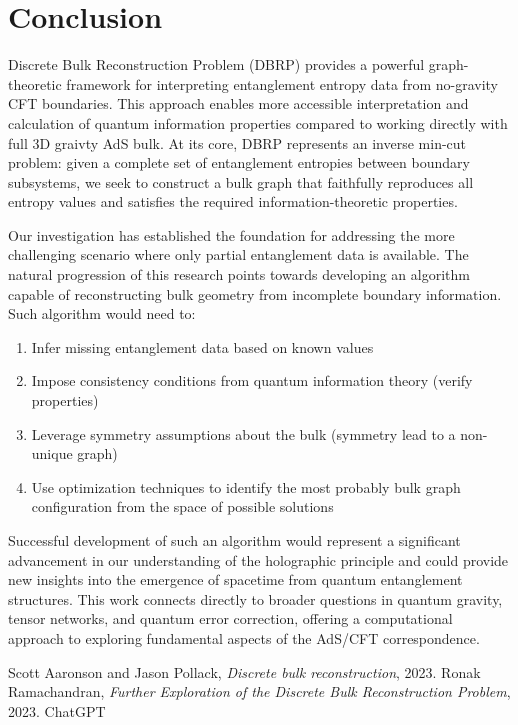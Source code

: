 \documentclass[12pt]{article}
\begin{document}
\section{Conclusion}

\hspace{0.5cm} Discrete Bulk Reconstruction Problem (DBRP) provides a powerful graph-theoretic framework for interpreting entanglement entropy data from no-gravity CFT boundaries. This approach enables more accessible interpretation and calculation of quantum information properties compared to working directly with full 3D graivty AdS bulk. At its core, DBRP represents an inverse min-cut problem: given a complete set of entanglement entropies between boundary subsystems, we seek to construct a bulk graph that faithfully reproduces all entropy values and satisfies the required information-theoretic properties. 

Our investigation has established the foundation for addressing the more challenging scenario where only partial entanglement data is available. The natural progression of this research points towards developing an algorithm capable of reconstructing bulk geometry from incomplete boundary information.
Such algorithm would need to:
\begin{enumerate}
    \item Infer missing entanglement data based on known values
    \item Impose consistency conditions from quantum information theory (verify properties)
    \item Leverage symmetry assumptions about the bulk (symmetry lead to a non-unique graph)
    \item Use optimization techniques to identify the most probably bulk graph configuration from the space of possible solutions
\end{enumerate}

Successful development of such an algorithm would represent a significant advancement in our understanding of the holographic principle and could provide new insights into the emergence of spacetime from quantum entanglement structures. This work connects directly to broader questions in quantum gravity, tensor networks, and quantum error correction, offering a computational approach to exploring fundamental aspects of the AdS/CFT correspondence.

\newpage

\begin{thebibliography}{9}
    Scott Aaronson and Jason Pollack, \textit{Discrete bulk reconstruction}, 2023.
    Ronak Ramachandran, \textit{Further Exploration of the Discrete Bulk Reconstruction Problem}, 2023.
    ChatGPT
\end{thebibliography}
\end{document}

